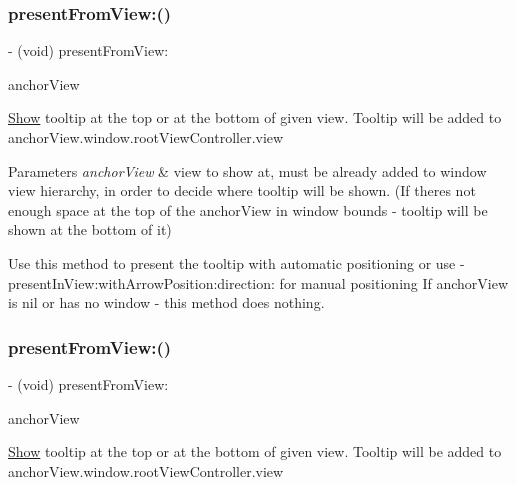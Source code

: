 \subsubsection{\texorpdfstring{present\+From\+View\+:()}{presentFromView:()}\hspace{0.1cm}{\footnotesize\ttfamily [2/5]}}
{\footnotesize\ttfamily -\/ (void) present\+From\+View\+: \begin{DoxyParamCaption}\item[{(U\+I\+View $\ast$)}]{anchor\+View }\end{DoxyParamCaption}}

\hyperlink{classShow}{Show} tooltip at the top or at the bottom of given view. Tooltip will be added to anchor\+View.\+window.\+root\+View\+Controller.\+view


\begin{DoxyParams}{Parameters}
{\em anchor\+View} & view to show at, must be already added to window view hierarchy, in order to decide where tooltip will be shown. (If there\textquotesingle{}s not enough space at the top of the anchor\+View in window bounds -\/ tooltip will be shown at the bottom of it)\\
\hline
\end{DoxyParams}
Use this method to present the tooltip with automatic positioning or use -\/present\+In\+View\+:with\+Arrow\+Position\+:direction\+: for manual positioning If anchor\+View is nil or has no window -\/ this method does nothing. \mbox{\label{interfaceFBTooltipView_a1f30bcab68dad52738ab50fd37855984}} 
\subsubsection{\texorpdfstring{present\+From\+View\+:()}{presentFromView:()}\hspace{0.1cm}{\footnotesize\ttfamily [3/5]}}
{\footnotesize\ttfamily -\/ (void) present\+From\+View\+: \begin{DoxyParamCaption}\item[{(U\+I\+View $\ast$)}]{anchor\+View }\end{DoxyParamCaption}}

\hyperlink{classShow}{Show} tooltip at the top or at the bottom of given view. Tooltip will be added to anchor\+View.\+window.\+root\+View\+Controller.\+view


